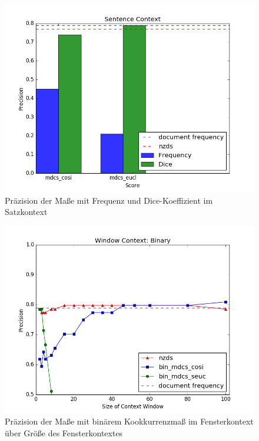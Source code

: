 \documentclass[11pt,numbers=noenddot]{scrartcl}
\begin{document}
\begin{figure}
    \includegraphics[width = \textwidth]{sent}
    \caption{Präzision der Maße mit Frequenz und Dice-Koeffizient im Satzkontext}
    \label{sent}
\end{figure}
\begin{figure}
    \includegraphics[width = \textwidth]{win_bin}
    \caption{Präzision der Maße mit binärem Kookkurrenzmaß im Fensterkontext über Größe des Fensterkontextes}
    \label{win_bin}
\end{figure}
\end{document}
